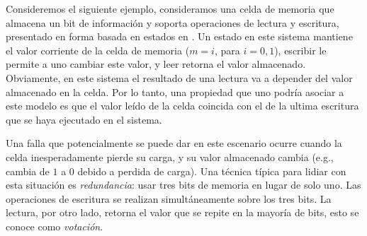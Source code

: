 \begin{example}
Consideremos el siguiente ejemplo, consideramos una celda de memoria que almacena un bit de información y soporta operaciones de lectura y escritura, presentado en forma basada en estados en \cite{DemasiCMA17}. Un estado en este sistema mantiene el valor corriente de la celda de memoria ($m=i$, para $i=0,1$), escribir le permite a uno cambiar este valor, y leer retorna el valor almacenado.  
Obviamente, en este sistema el resultado de una lectura va a depender del valor almacenado en la celda. 
Por lo tanto, una propiedad que uno podría asociar a este modelo es que el valor leído de la celda coincida con el de la ultima escritura que se haya ejecutado en el sistema.
    
Una falla que potencialmente se puede dar en este escenario ocurre cuando la celda inesperadamente pierde su carga, y su valor almacenado cambia (e.g., cambia de $1$ a $0$ debido a perdida de carga). Una técnica típica para lidiar con esta situación es \emph{redundancia}: usar tres bits de memoria en lugar de solo uno. Las operaciones de escritura se realizan simultáneamente sobre los tres bits. La lectura, por otro lado, retorna el valor que se repite en la mayoría de bits, esto se conoce como \emph{votación}. 


\end{example}
